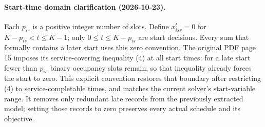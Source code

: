 \documentclass{article}
\begin{document}
\paragraph{Start-time domain clarification (2026-10-23).}
Each $p_{is}$ is a positive integer number of slots. Define $x_{isr}^t=0$
for $K-p_{is}<t\le K-1$; only $0\le t\le K-p_{is}$ are start decisions.
Every sum that formally contains a later start uses this zero convention.
The original PDF page 15 imposes its service-covering inequality (4) at
all start times: for a late start fewer than $p_{is}$ binary occupancy
slots remain, so that inequality already forces the start to zero.
This explicit convention restores that boundary after restricting (4) to
service-completable times, and matches the current solver's start-variable range.
It removes only redundant late records from the previously extracted model;
setting those records to zero preserves every actual schedule and its objective.
\end{document}
